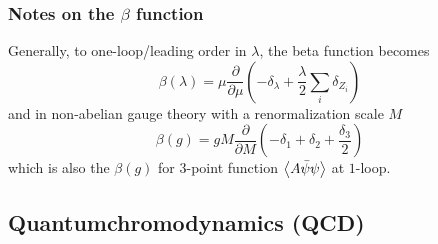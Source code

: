 \subsubsection{Notes on the $\beta$ function}
Generally, to one-loop/leading order in $\lambda$, the beta function becomes
\begin{equation*}
	\beta(\lambda) = \mu \frac{\partial}{\partial \mu} \left(-\delta_{\lambda}+\frac{\lambda}{2} \sum_i \delta_{Z_i}\right)
\end{equation*}
and in non-abelian gauge theory with a renormalization scale $M$
\begin{equation*}
	\beta(g) = g M\frac{\partial}{\partial M} \left(-\delta_1+\delta_2+\frac{\delta_3}{2} \right)
\end{equation*}
which is also the $\beta(g)$ for $3$-point function $\expval{A\bar{\psi}\psi}$ at $1$-loop.
\subsection{Quantumchromodynamics (QCD)}
